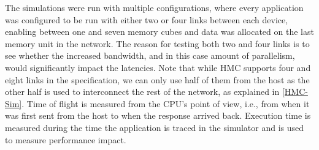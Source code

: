 The simulations were run with multiple configurations, where every application was configured to be run with either two or four links between each device, enabling between one and seven memory cubes and data was allocated on the last memory unit in the network. The reason for testing both two and four links is to see whether the increased bandwidth, and in this case amount of parallelism, would significantly impact the latencies. Note that while HMC supports four and eight links in the specification, we can only use half of them from the host as the other half is used to interconnect the rest of the network, as explained in \ref{HMC-Sim}. Time of flight is measured from the CPU's point of view, i.e., from when it was first sent from the host to when the response arrived back. Execution time is measured during the time the application is traced in the simulator and is used to measure performance impact.
\bigskip